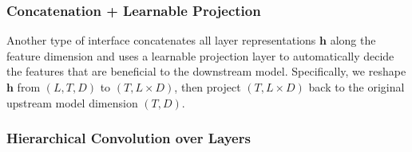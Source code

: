 

\subsubsection{Concatenation + Learnable Projection}

Another type of interface concatenates all layer representations $\boldsymbol{h}$ along the feature dimension and uses a learnable projection layer to automatically decide the features that are beneficial to the downstream model. 
Specifically, we reshape $\boldsymbol{h}$ from $\left( L,T,D \right)$ to $\left( T,L\times D \right)$,
then 
project $\left( T,L\times D \right)$ back to the original upstream model dimension $\left( T, D \right)$.



\subsubsection{Hierarchical Convolution over Layers}

